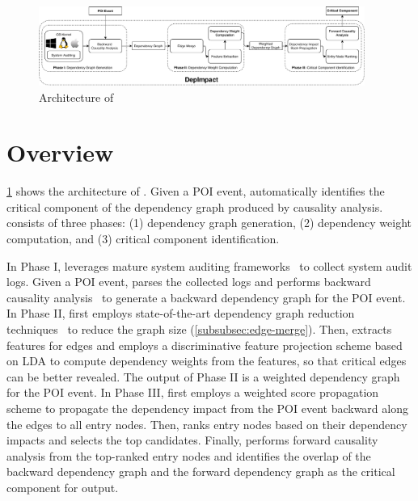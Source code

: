 
\begin{figure}[t]
    \centering
    \includegraphics[width=0.95\textwidth,clip]{figs/architecture.pdf}
    \caption{Architecture of \tool}
    \label{fig:architecture}
\end{figure}


\section{Overview}
\label{sec:overview}



\cref{fig:architecture} shows the architecture of \tool.
%
Given a POI event, \tool automatically identifies the critical component of the dependency graph produced by causality analysis.
%
\tool consists of three phases: (1) dependency graph generation, (2) dependency weight computation, and (3) critical component identification.

In Phase I, \tool leverages mature system auditing frameworks~\cite{auditd,etw,dtrace,sysdig}
to collect system audit logs.
Given a POI event, \tool parses the collected logs and performs backward causality analysis~\cite{backtracking,backtracking2} to generate a backward dependency graph for the POI event. 
In Phase II, \tool first employs state-of-the-art dependency graph reduction techniques~\cite{reduction} to reduce the graph size
(\cref{subsubsec:edge-merge}).
Then, \tool extracts features for edges
and employs a discriminative feature projection scheme based on LDA to compute dependency weights from the features, so that critical edges can be better revealed.
The output of Phase II is a weighted dependency graph for the POI event.
In Phase III, \tool first employs a weighted score propagation scheme to
propagate the dependency impact from the POI event 
backward along the edges to all entry nodes.
Then, \tool ranks entry nodes based on their dependency impacts and selects the top candidates.
Finally, \tool performs forward causality analysis from the top-ranked entry nodes and identifies the overlap of the backward dependency graph and the forward dependency graph as the critical component for output. 




